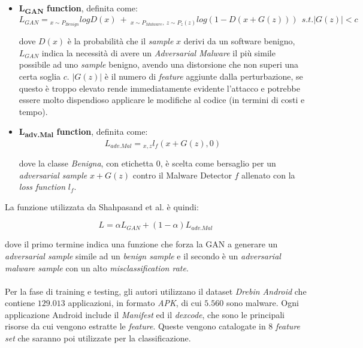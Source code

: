 \begin{itemize}
    \item \textbf{L\textsubscript{GAN} function}\cite{8672711}, definita come: 
            \[
                L_{GAN} = {}_{x \sim P_{Benign}} logD(x) \ + \
                          {}_{x \sim P_{Malware}, \ z \sim P_{z}(z)} log(1 - D(x + G(z))) \ \ 
                          s.t.|G(z)| < c
            \]
            
            dove \(D(x)\) è la probabilità che il \textit{sample} \(x\) derivi da un software benigno, \(L_{GAN}\) indica la necessità di avere un \textit{Adversarial Malware} il più simile possibile ad uno \textit{sample} benigno, avendo una distorsione che non superi una certa soglia \(c\). \(|G(z)|\) è il numero di \textit{feature} aggiunte dalla perturbazione, se questo è troppo elevato rende immediatamente evidente l'attacco e potrebbe essere molto dispendioso applicare le modifiche al codice (in termini di costi e tempo).
    
    \item \textbf{L\textsubscript{adv.Mal} function}\cite{8672711}, definita come: 
            \[
                L_{adv.Mal} = {}_{x, z} l_f(x + G(z), 0)
            \]
            
            dove la classe \textit{Benigna}, con etichetta 0, è scelta come bersaglio per un \textit{adversarial sample} \(x + G(z)\) contro il Malware Detector \(f\) allenato con la \textit{loss function} \(l_f\). %
\end{itemize}

La funzione utilizzata da Shahpasand et al. è quindi:

\[
    L = \alpha L_{GAN} + (1 - \alpha )L_{adv.Mal}
\]



dove il primo termine indica una funzione che forza la GAN a generare un \textit{adversarial sample} simile ad un \textit{benign sample} e il secondo è un \textit{adversarial malware sample} con un alto \textit{misclassification rate}.\\
\\
Per la fase di training e testing, gli autori utilizzano il dataset \textit{Drebin Android} che contiene \(129.013\) applicazioni, in formato \textit{APK}, di cui \(5.560\) sono malware. Ogni applicazione Android include il \textit{Manifest} ed il \textit{dexcode}, che sono le principali risorse da cui vengono estratte le \textit{feature}. Queste vengono catalogate in 8 \textit{feature set} che saranno poi utilizzate per la classificazione.\\

